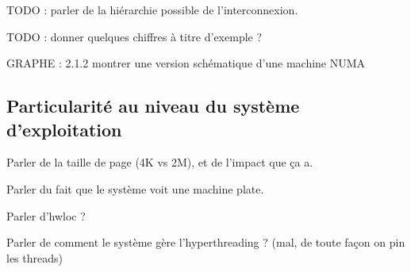 TODO : parler de la hiérarchie possible de l'interconnexion.

TODO : donner quelques chiffres à titre d'exemple ?

GRAPHE : 2.1.2 montrer une version schématique d'une machine NUMA


\subsection{Particularité au niveau du système d'exploitation}


Parler de la taille de page (4K vs 2M), et de l'impact que ça a.

Parler du fait que le système voit une machine plate.

Parler d'hwloc ?

Parler de comment le système gère l'hyperthreading ? (mal, de toute façon on pin les threads)


